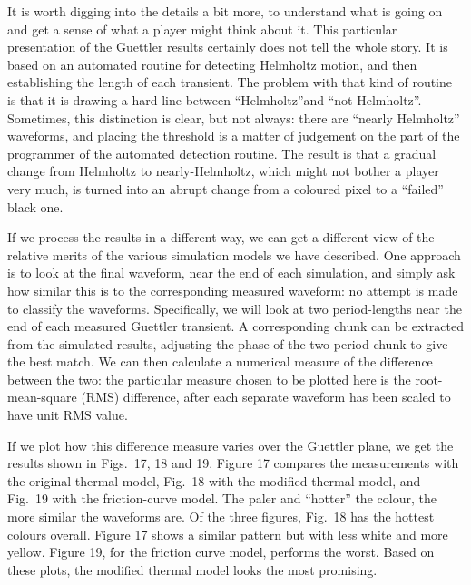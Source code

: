   It is worth digging into the details a bit more, to understand what is going 
  on and get a sense of what a player might think about it. This particular 
  presentation of the Guettler results certainly does not tell the whole story. 
  It is based on an automated routine for detecting Helmholtz motion, and then 
  establishing the length of each transient. The problem with that kind of 
  routine is that it is drawing a hard line between “Helmholtz”and “not 
  Helmholtz”. Sometimes, this distinction is clear, but not always: there are 
  “nearly Helmholtz” waveforms, and placing the threshold is a matter of 
  judgement on the part of the programmer of the automated detection routine. 
  The result is that a gradual change from Helmholtz to nearly-Helmholtz, which 
  might not bother a player very much, is turned into an abrupt change from a 
  coloured pixel to a ``failed'' black one. 

  If we process the results in a different way, we can get a different view of 
  the relative merits of the various simulation models we have described. One 
  approach is to look at the final waveform, near the end of each simulation, 
  and simply ask how similar this is to the corresponding measured waveform: no 
  attempt is made to classify the waveforms. Specifically, we will look at two 
  period-lengths near the end of each measured Guettler transient. A 
  corresponding chunk can be extracted from the simulated results, adjusting 
  the phase of the two-period chunk to give the best match. We can then 
  calculate a numerical measure of the difference between the two: the 
  particular measure chosen to be plotted here is the root-mean-square (RMS) 
  difference, after each separate waveform has been scaled to have unit RMS 
  value. 

  If we plot how this difference measure varies over the Guettler plane, we get 
  the results shown in Figs.\ 17, 18 and 19. Figure 17 compares the 
  measurements with the original thermal model, Fig.\ 18 with the modified 
  thermal model, and Fig.\ 19 with the friction-curve model. The paler and 
  ``hotter'' the colour, the more similar the waveforms are. Of the three 
  figures, Fig.\ 18 has the hottest colours overall. Figure 17 shows a similar 
  pattern but with less white and more yellow. Figure 19, for the friction 
  curve model, performs the worst. Based on these plots, the modified thermal 
  model looks the most promising. 


